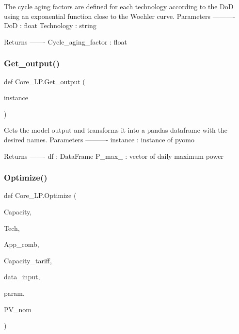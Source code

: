 \begin{DoxyVerb}The cycle aging factors are defined for each technology according
to the DoD using an exponential function close to the Woehler curve.
Parameters
----------
DoD : float
Technology : string

Returns
-------
Cycle_aging_factor : float
\end{DoxyVerb}
 \mbox{\label{namespace_core___l_p_a6d35392ffd5384b704752a0442ad2332}} 
\subsubsection{\texorpdfstring{Get\+\_\+output()}{Get\_output()}}
{\footnotesize\ttfamily def Core\+\_\+\+L\+P.\+Get\+\_\+output (\begin{DoxyParamCaption}\item[{}]{instance }\end{DoxyParamCaption})}

\begin{DoxyVerb}Gets the model output and transforms it into a pandas dataframe
with the desired names.
Parameters
----------
instance : instance of pyomo

Returns
-------
df : DataFrame
P_max_ : vector of daily maximum power\end{DoxyVerb}
 \mbox{\label{namespace_core___l_p_ae8eea760613de77c4254a1ab54c8ea19}} 
\subsubsection{\texorpdfstring{Optimize()}{Optimize()}}
{\footnotesize\ttfamily def Core\+\_\+\+L\+P.\+Optimize (\begin{DoxyParamCaption}\item[{}]{Capacity,  }\item[{}]{Tech,  }\item[{}]{App\+\_\+comb,  }\item[{}]{Capacity\+\_\+tariff,  }\item[{}]{data\+\_\+input,  }\item[{}]{param,  }\item[{}]{P\+V\+\_\+nom }\end{DoxyParamCaption})}

